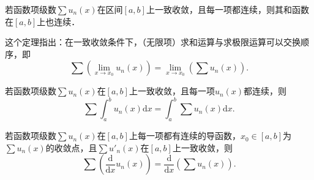 \documentclass[../../main.tex]{subfiles}
\begin{document}
\begin{theorem}[连续性]\label{theorem:定理13.1254486916}
若函数项级数\(\sum u_n(x)\)在区间\([a, b]\)上一致收敛，且每一项都连续，则其和函数在\([a, b]\)上也连续．
\end{theorem}
\begin{note}
这个定理指出：在一致收敛条件下，（无限项）求和运算与求极限运算可以交换顺序，即
\[
\sum \left( \lim_{x \to x_0} u_n(x) \right) = \lim_{x \to x_0} \left( \sum u_n(x) \right). 
\]
\end{note}

\begin{theorem}[逐项求积]
若函数项级数\(\sum u_n(x)\)在\([a, b]\)上一致收敛，且每一项\(u_n(x)\)都连续，则
\[
\sum \int_a^b u_n(x) \mathrm{d}x = \int_a^b \sum u_n(x) \mathrm{d}x. 
\]
\end{theorem}

\begin{theorem}[逐项求导]\label{theorem:级数逐项求导定理}
若函数项级数\(\sum u_n(x)\)在\([a, b]\)上每一项都有连续的导函数，\(x_0 \in [a, b]\)为\(\sum u_n(x)\)的收敛点，且\(\sum u'_n(x)\)在\([a, b]\)上一致收敛，则
\[
\sum \left( \frac{\mathrm{d}}{\mathrm{d}x} u_n(x) \right) = \frac{\mathrm{d}}{\mathrm{d}x} \left( \sum u_n(x) \right). 
\]
\end{theorem}
\end{document}
